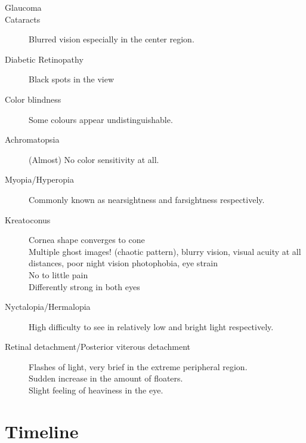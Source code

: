 \documentclass{acm_proc_article-sp}
\newcommand{\todo}[1]{\textcolor{Red}{#1}}
\begin{document}
\begin{description}
    \item[Glaucoma]
    \item[Cataracts]
        Blurred vision especially in the center region.

    \item[Diabetic Retinopathy]
        Black spots in the view

    \item[Color blindness]
        Some colours appear undistinguishable.

    \item[Achromatopsia]
        (Almost) No color sensitivity at all.

    \item[Myopia/Hyperopia]
        Commonly known as nearsightness and farsightness respectively.

    \item[Kreatoconus]
        Cornea shape converges to cone \\
        Multiple ghost images! (chaotic pattern),
        blurry vision, visual acuity at all distances, poor night vision
        photophobia, eye strain \\
        No to little pain \\
        Differently strong in both eyes

    \item[Nyctalopia/Hermalopia]
        High difficulty to see in relatively low and bright light respectively.

    \item[Retinal detachment/Posterior viterous detachment]
        Flashes of light, very brief in the extreme peripheral region.\\
        Sudden increase in the amount of floaters. \\
        Slight feeling of heaviness in the eye.

\end{description}

\section{Timeline}
\todo{}
\printbibliography

\balancecolumns
\end{document}
